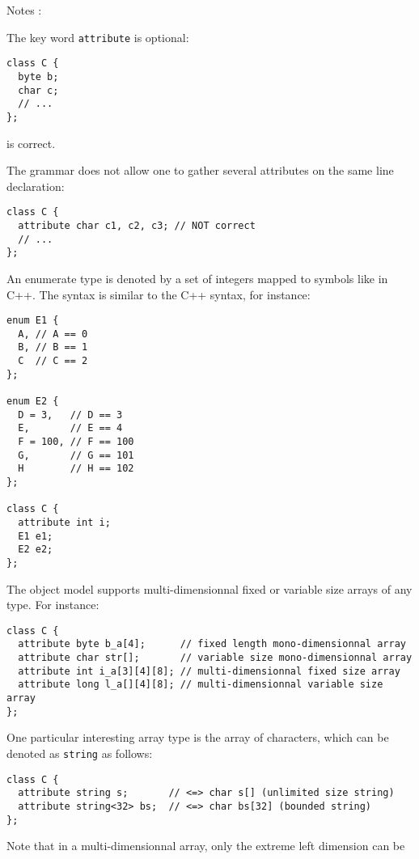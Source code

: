 Notes :
\be
\vspace{-0.2cm}
\item The key word \texttt{attribute} is optional:
\vspace{-0.2cm}
\begin{verbatim}
class C {
  byte b;
  char c;
  // ...
};
\end{verbatim}
\vspace{-0.2cm}
is correct.
\item The grammar does not allow one to gather several attributes on
the same line declaration:
\vspace{-0.2cm}
\begin{verbatim}
class C {
  attribute char c1, c2, c3; // NOT correct
  // ...
};
\end{verbatim}
\ee
{}
An enumerate type is denoted by a set of integers mapped to symbols
like in C++.
The syntax is similar to the C++ syntax, for instance:
\vspace{-0.2cm}
\begin{verbatim}
enum E1 {
  A, // A == 0
  B, // B == 1
  C  // C == 2
};

enum E2 {
  D = 3,   // D == 3
  E,       // E == 4
  F = 100, // F == 100
  G,       // G == 101
  H        // H == 102
};

class C {
  attribute int i;
  E1 e1;
  E2 e2;
};
\end{verbatim}
The object model supports multi-dimensionnal fixed or variable size arrays
of any type. For instance:
\vspace{-0.2cm}
\begin{verbatim}
class C {
  attribute byte b_a[4];      // fixed length mono-dimensionnal array
  attribute char str[];       // variable size mono-dimensionnal array
  attribute int i_a[3][4][8]; // multi-dimensionnal fixed size array
  attribute long l_a[][4][8]; // multi-dimensionnal variable size array
};
\end{verbatim}
One particular interesting array type is the array of characters, which
can be denoted as \texttt{string} as follows:
\vspace{-0.2cm}
\begin{verbatim}
class C {
  attribute string s;       // <=> char s[] (unlimited size string)
  attribute string<32> bs;  // <=> char bs[32] (bounded string)
};
\end{verbatim}
Note that in a multi-dimensionnal array, only the extreme left dimension can be

